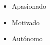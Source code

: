 %

\twocolumnsection
{
\begin{skills}
\end{skills}}
{
\vspace{1em}
\begin{itemize}
	\item Apasionado
	\item Motivado                    
    \item Autónomo
\end{itemize}
}
